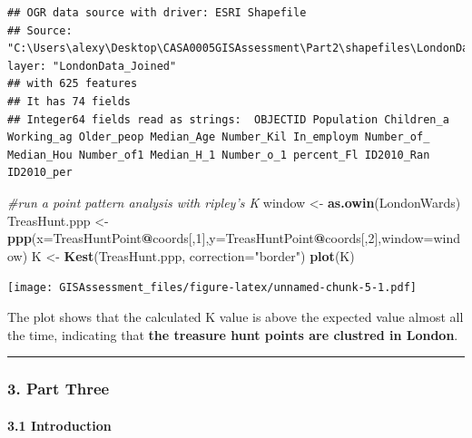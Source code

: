 \documentclass[]{article}
\newenvironment{Shaded}{\begin{snugshade}}{\end{snugshade}}
\newcommand{\KeywordTok}[1]{\textcolor[rgb]{0.13,0.29,0.53}{\textbf{#1}}}
\newcommand{\DataTypeTok}[1]{\textcolor[rgb]{0.13,0.29,0.53}{#1}}
\newcommand{\DecValTok}[1]{\textcolor[rgb]{0.00,0.00,0.81}{#1}}
\newcommand{\StringTok}[1]{\textcolor[rgb]{0.31,0.60,0.02}{#1}}
\newcommand{\CommentTok}[1]{\textcolor[rgb]{0.56,0.35,0.01}{\textit{#1}}}
\newcommand{\OperatorTok}[1]{\textcolor[rgb]{0.81,0.36,0.00}{\textbf{#1}}}
\newcommand{\NormalTok}[1]{#1}
\let\oldparagraph\paragraph
\renewcommand{\paragraph}[1]{\oldparagraph{#1}\mbox{}}
\begin{document}
\begin{verbatim}
## OGR data source with driver: ESRI Shapefile 
## Source: "C:\Users\alexy\Desktop\CASA0005GISAssessment\Part2\shapefiles\LondonData_Joined.shp", layer: "LondonData_Joined"
## with 625 features
## It has 74 fields
## Integer64 fields read as strings:  OBJECTID Population Children_a Working_ag Older_peop Median_Age Number_Kil In_employm Number_of_ Median_Hou Number_of1 Median_H_1 Number_o_1 percent_Fl ID2010_Ran ID2010_per
\end{verbatim}

\begin{Shaded}
\begin{Highlighting}[]
\CommentTok{#run a point pattern analysis with ripley's K}
\NormalTok{window <-}\StringTok{ }\KeywordTok{as.owin}\NormalTok{(LondonWards)}
\NormalTok{TreasHunt.ppp <-}\StringTok{ }\KeywordTok{ppp}\NormalTok{(}\DataTypeTok{x=}\NormalTok{TreasHuntPoint}\OperatorTok{@}\NormalTok{coords[,}\DecValTok{1}\NormalTok{],}\DataTypeTok{y=}\NormalTok{TreasHuntPoint}\OperatorTok{@}\NormalTok{coords[,}\DecValTok{2}\NormalTok{],}\DataTypeTok{window=}\NormalTok{window)}
\NormalTok{K <-}\StringTok{ }\KeywordTok{Kest}\NormalTok{(TreasHunt.ppp, }\DataTypeTok{correction=}\StringTok{"border"}\NormalTok{)}
\KeywordTok{plot}\NormalTok{(K)}
\end{Highlighting}
\end{Shaded}

\texttt{[image: GISAssessment\_files/figure-latex/unnamed-chunk-5-1.pdf]}

The plot shows that the calculated K value is above the expected value
almost all the time, indicating that \textbf{the treasure hunt points
are clustred in London}.

\begin{center}\rule{0.5\linewidth}{\linethickness}\end{center}

\subsubsection{3. Part Three}\label{part-three}

\paragraph{3.1 Introduction}\label{introduction}
\end{document}
